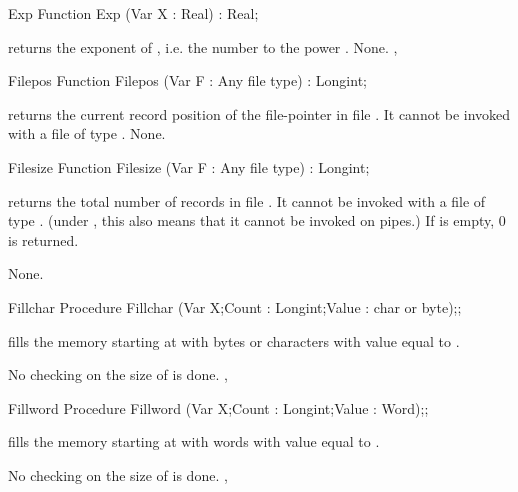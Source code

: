 \documentclass{report}
\begin{document}
\html{}
\begin{function}{Exp}
\Declaration
Function Exp (Var X : Real) : Real;

\Description
{} returns the exponent of , i.e. the number  to the
power .
\Errors
None.
\SeeAlso
{}, 
\end{function}
\html{}
\begin{function}{Filepos}
\Declaration
Function Filepos (Var F : Any file type) : Longint;

\Description
{} returns the current record position of the file-pointer in file
. It cannot be invoked with a file of type .
\Errors
None.
\SeeAlso
{}
\end{function}
\html{}
\begin{function}{Filesize}
\Declaration
Function Filesize (Var F : Any file type) : Longint;

\Description
{} returns the total number of records in file .
It cannot be invoked with a file of type . (under \linux, this
also means that it cannot be invoked on pipes.)
If  is empty, 0 is returned.

\Errors
None.
\SeeAlso
{}
\end{function}
\html{}
\begin{procedure}{Fillchar}
\Declaration
Procedure Fillchar (Var X;Count : Longint;Value : char or byte);;

\Description
{} fills the memory starting at  with  bytes
or characters with value equal to .

\Errors
No checking on the size of  is done.
\SeeAlso
{}, 
\end{procedure}
\html{}
\begin{procedure}{Fillword}
\Declaration
Procedure Fillword (Var X;Count : Longint;Value : Word);;

\Description
{} fills the memory starting at  with  words
with value equal to .

\Errors
No checking on the size of  is done.
\SeeAlso
{}, 
\end{procedure}
\end{document}
